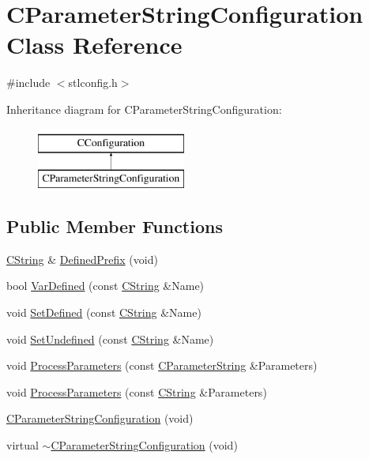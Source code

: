 \hypertarget{classCParameterStringConfiguration}{\section{C\-Parameter\-String\-Configuration Class Reference}
\label{classCParameterStringConfiguration}
}


{\ttfamily \#include $<$stlconfig.\-h$>$}

Inheritance diagram for C\-Parameter\-String\-Configuration\-:\begin{figure}[H]
\begin{center}
\leavevmode
\includegraphics[height=2.000000cm]{db/d15/classCParameterStringConfiguration}
\end{center}
\end{figure}
\subsection*{Public Member Functions}
\begin{DoxyCompactItemize}
\item 
\hyperlink{classCString}{C\-String} \& \hyperlink{classCParameterStringConfiguration_a22c75090688ace9f90614f78cdebb349}{Defined\-Prefix} (void)
\item 
bool \hyperlink{classCParameterStringConfiguration_a0302a46cb0c6abf192fb53eb5f30fbde}{Var\-Defined} (const \hyperlink{classCString}{C\-String} \&Name)
\item 
void \hyperlink{classCParameterStringConfiguration_ad864d7c3bd8422bcc334f255f9f197e4}{Set\-Defined} (const \hyperlink{classCString}{C\-String} \&Name)
\item 
void \hyperlink{classCParameterStringConfiguration_aefd29efdc68f89de605e16ac8f7b1efc}{Set\-Undefined} (const \hyperlink{classCString}{C\-String} \&Name)
\item 
void \hyperlink{classCParameterStringConfiguration_a692fda1ac7524cf90ec4603baf253f98}{Process\-Parameters} (const \hyperlink{classCParameterString}{C\-Parameter\-String} \&Parameters)
\item 
void \hyperlink{classCParameterStringConfiguration_a959766884f6fc5f0136e3d4098d02f36}{Process\-Parameters} (const \hyperlink{classCString}{C\-String} \&Parameters)
\item 
\hyperlink{classCParameterStringConfiguration_a985f6ec1ac535d8d7231ad86fb4e9095}{C\-Parameter\-String\-Configuration} (void)
\item 
virtual \hyperlink{classCParameterStringConfiguration_a1c3e943f777f6892e11f6808fbf086a3}{$\sim$\-C\-Parameter\-String\-Configuration} (void)
\end{DoxyCompactItemize}
